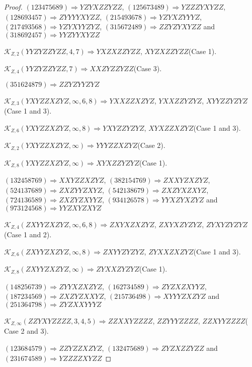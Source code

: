 \documentclass[12pt]{article}
\theoremstyle{plain}
\theoremstyle{definition}
\theoremstyle{remark}
\newcommand{\fancy}[1]{\mathcal{#1}}
\def\K{\fancy{K}}
\begin{document}
\begin{proof}
	$(1 2 3 4 7 5 6 8 9)\Rightarrow YZYXZZYZZ$, $(1 2 5 6 7 3 4 8 9)\Rightarrow YZZZYXYZZ$, $(1 2 8 6 9 3 4 5 7)\Rightarrow ZYYYYXYZZ$, $(2 1 5 4 9 3 6 7 8)\Rightarrow YZYXZYYYZ$, $(2 1 7 4 9 3 5 6 8)\Rightarrow YZYXYYZYZ$, $(3 1 5 6 7 2 4 8 9)\Rightarrow ZZYZYXYZZ$ and $(3 1 8 6 9 2 4 5 7)\Rightarrow YYZYYXYZZ$
	
	
	$\K_{Z,2}(YYZYZZYZZ,4, 7)\Rightarrow $$YXZXZZYZZ$, $XYZXZZYZZ$(Case 1).
	
	$\K_{Z,4}(YYZYZZYZZ,7)\Rightarrow $$XXZYZZYZZ$(Case 3).
	
	
	
	$(3 5 1 6 2 4 8 7 9)\Rightarrow ZZYZYYZYZ$
	
	
	$\K_{Z,3}(YXYZZXZYZ,\infty,6, 8)\Rightarrow $$YXXZZXZYZ$, $YXXZZYZYZ$, $XYYZZYZYZ$(Case 1 and 3).
	
	$\K_{Z,6}(YXYZZXZYZ,\infty,8)\Rightarrow $$YXYZZYZYZ$, $XYXZZXZYZ$(Case 1 and 3).
	
	$\K_{Z,2}(YXYZZXZYZ,\infty)\Rightarrow $$YYYZZXZYZ$(Case 2).
	
	$\K_{Z,8}(YXYZZXZYZ,\infty)\Rightarrow $$XYXZZYZYZ$(Case 1).
	
	
	
	$(1 3 2 4 5 8 7 6 9)\Rightarrow XXYZZXZYZ$, $(3 8 2 1 5 4 7 6 9)\Rightarrow ZXXYZXZYZ$, $(5 2 4 1 3 7 6 8 9)\Rightarrow ZXZYYZXYZ$, $(5 4 2 1 3 8 6 7 9)\Rightarrow ZXZYXZXYZ$, $(7 2 4 1 3 6 5 8 9)\Rightarrow ZXZYZXYYZ$, $(9 3 4 1 2 6 5 7 8)\Rightarrow YYXZYXZYZ$ and $(9 7 3 1 2 4 5 6 8)\Rightarrow YYZXYZXYZ$
	
	
	$\K_{Z,4}(ZXYYZXZYZ,\infty,6, 8)\Rightarrow $$ZXYXZXZYZ$, $ZXYXZYZYZ$, $ZYXYZYZYZ$(Case 1 and 2).
	
	$\K_{Z,6}(ZXYYZXZYZ,\infty,8)\Rightarrow $$ZXYYZYZYZ$, $ZYXXZXZYZ$(Case 1 and 3).
	
	$\K_{Z,8}(ZXYYZXZYZ,\infty)\Rightarrow $$ZYXXZYZYZ$(Case 1).
	
	
	
	$(1 4 8 2 5 6 7 3 9)\Rightarrow ZYYXZXZYZ$, $(1 6 2 7 3 4 5 8 9)\Rightarrow ZYZXZXYYZ$, $(1 8 7 2 3 4 5 6 9)\Rightarrow ZXZYZXXYZ$, $(2 1 5 7 3 6 4 9 8)\Rightarrow XYYYZXZYZ$ and $(2 5 1 3 6 4 7 9 8)\Rightarrow ZYZXXYYYZ$
	
	
	$\K_{Z,\infty}(ZZYXYZZZZ,3, 4, 5)\Rightarrow $$ZZXXYZZZZ$, $ZZYYYZZZZ$, $ZZXYYZZZZ$( Case 2 and 3).
	
	
	
	$(1 2 3 6 8 4 5 7 9)\Rightarrow ZZYZZXZYZ$, $(1 3 2 4 7 5 6 8 9)\Rightarrow ZYZXZZYZZ$ and $(2 3 1 6 7 4 5 8 9)\Rightarrow YZZZZXYZZ$
	

\end{proof}
\end{document}
